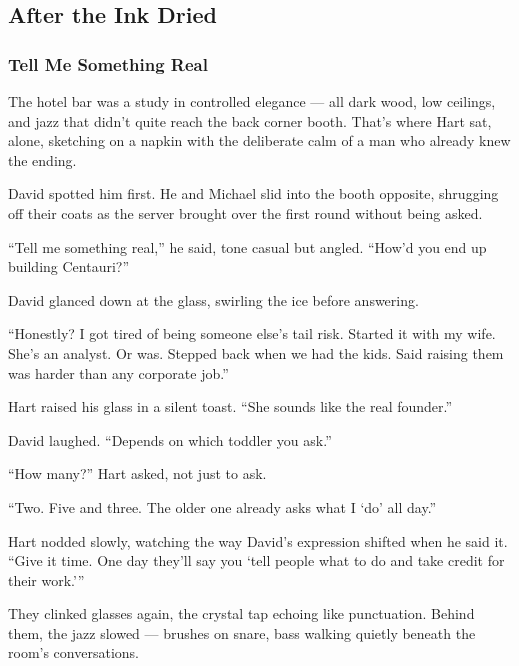\subsection{After the Ink Dried}

\subsubsection{Tell Me Something Real}

The hotel bar was a study in controlled elegance — all dark wood, low ceilings, and jazz that didn’t 
quite reach the back corner booth.
That’s where Hart sat, alone, sketching on a napkin with the deliberate calm of a man who already knew 
the ending.

David spotted him first.
He and Michael slid into the booth opposite, shrugging off their coats as the server brought over the 
first round without being asked.

“Tell me something real,” he said, tone casual but angled. “How’d you end up building Centauri?”

David glanced down at the glass, swirling the ice before answering.

“Honestly? I got tired of being someone else’s tail risk. Started it with my wife. She’s an analyst. 
Or was. Stepped back when we had the kids. Said raising them was harder than any corporate job.”

Hart raised his glass in a silent toast. “She sounds like the real founder.”

David laughed. “Depends on which toddler you ask.”

“How many?” Hart asked, not just to ask.

“Two. Five and three. The older one already asks what I ‘do’ all day.”

Hart nodded slowly, watching the way David’s expression shifted when he said it.
“Give it time. One day they’ll say you ‘tell people what to do and take credit for their work.’”

They clinked glasses again, the crystal tap echoing like punctuation. Behind them, the jazz slowed — 
brushes on snare, bass walking quietly beneath the room’s conversations.

\medskip

